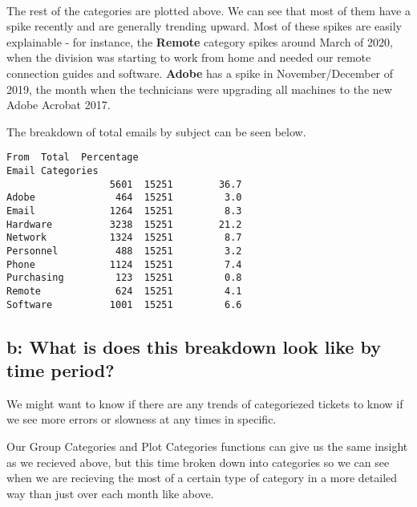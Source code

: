\documentclass[11pt]{article}
\makeatletter
\newcommand{\boxspacing}{\kern\kvtcb@left@rule\kern\kvtcb@boxsep}
\newcommand{\prompt}[4]{
        \ttfamily\llap{{\color{#2}[#3]:\hspace{3pt}#4}}\vspace{-\baselineskip}
    }
\makeatother
\begin{document}
    
    \begin{center}
    \end{center}
    { \hspace*{\fill} \\}
    
    The rest of the categories are plotted above. We can see that most of
them have a spike recently and are generally trending upward. Most of
these spikes are easily explainable - for instance, the \textbf{Remote}
category spikes around March of 2020, when the division was starting to
work from home and needed our remote connection guides and software.
\textbf{Adobe} has a spike in November/December of 2019, the month when
the technicians were upgrading all machines to the new Adobe Acrobat
2017.


    The breakdown of total emails by subject can be seen below.


            \begin{tcolorbox}[breakable, size=fbox, boxrule=.5pt, pad at break*=1mm, opacityfill=0]
\prompt{Out}{outcolor}{30}{\boxspacing}
\begin{Verbatim}[commandchars=\\\{\}]
                  From  Total  Percentage
Email Categories
                  5601  15251        36.7
Adobe              464  15251         3.0
Email             1264  15251         8.3
Hardware          3238  15251        21.2
Network           1324  15251         8.7
Personnel          488  15251         3.2
Phone             1124  15251         7.4
Purchasing         123  15251         0.8
Remote             624  15251         4.1
Software          1001  15251         6.6
\end{Verbatim}
\end{tcolorbox}
        
    \hypertarget{b-what-is-does-this-breakdown-look-like-by-time-period}{%
\subsection{b: What is does this breakdown look like by time
period?}\label{b-what-is-does-this-breakdown-look-like-by-time-period}}

We might want to know if there are any trends of categoriezed tickets to
know if we see more errors or slowness at any times in specific.

 
    Our Group Categories and Plot Categories functions can give us the same
insight as we recieved above, but this time broken down into categories
so we can see when we are recieving the most of a certain type of
category in a more detailed way than just over each month like above.
\end{document}
